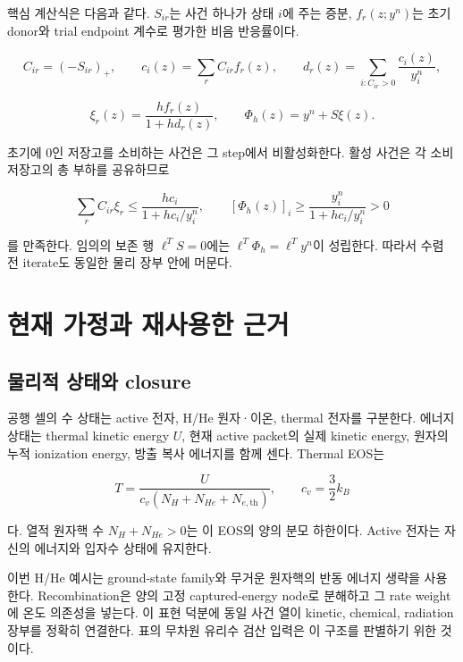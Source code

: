 \documentclass[11pt,a4paper]{article}
\begin{document}
핵심 계산식은 다음과 같다. \(S_{ir}\)는 사건 하나가 상태 \(i\)에 주는 증분, \(f_r(z;y^n)\)는 초기 donor와 trial endpoint 계수로 평가한 비음 반응률이다.

\[
C_{ir}=(-S_{ir})_+,\qquad
c_i(z)=\sum_r C_{ir}f_r(z),\qquad
d_r(z)=\sum_{i:C_{ir}>0}\frac{c_i(z)}{y_i^n},
\]

\[
\boxed{
\xi_r(z)=\frac{h f_r(z)}{1+h d_r(z)},\qquad
\Phi_h(z)=y^n+S\xi(z).
}
\]

초기에 0인 저장고를 소비하는 사건은 그 step에서 비활성화한다. 활성 사건은 각 소비 저장고의 총 부하를 공유하므로

\[
\sum_r C_{ir}\xi_r
\le\frac{h c_i}{1+h c_i/y_i^n},\qquad
[\Phi_h(z)]_i\ge\frac{y_i^n}{1+h c_i/y_i^n}>0
\]

를 만족한다. 임의의 보존 행 \(\ell^TS=0\)에는 \(\ell^T\Phi_h=\ell^Ty^n\)이 성립한다. 따라서 수렴 전 iterate도 동일한 물리 장부 안에 머문다.

\hypertarget{uxd604uxc7ac-uxac00uxc815uxacfc-uxc7acuxc0acuxc6a9uxd55c-uxadfcuxac70}{%
\section{현재 가정과 재사용한 근거}\label{uxd604uxc7ac-uxac00uxc815uxacfc-uxc7acuxc0acuxc6a9uxd55c-uxadfcuxac70}}

\hypertarget{uxbb3cuxb9acuxc801-uxc0c1uxd0dcuxc640-closure}{%
\subsection{물리적 상태와 closure}\label{uxbb3cuxb9acuxc801-uxc0c1uxd0dcuxc640-closure}}

공행 셀의 수 상태는 active 전자, H/He 원자·이온, thermal 전자를 구분한다. 에너지 상태는 thermal kinetic energy \(U\), 현재 active packet의 실제 kinetic energy, 원자의 누적 ionization energy, 방출 복사 에너지를 함께 센다. Thermal EOS는

\[
T=\frac{U}{c_v(N_H+N_{He}+N_{e,\mathrm{th}})},\qquad
c_v=\frac32k_B
\]

다. 열적 원자핵 수 \(N_H+N_{He}>0\)는 이 EOS의 양의 분모 하한이다. Active 전자는 자신의 에너지와 입자수 상태에 유지한다.

이번 H/He 예시는 ground-state family와 무거운 원자핵의 반동 에너지 생략을 사용한다. Recombination은 양의 고정 captured-energy node로 분해하고 그 rate weight에 온도 의존성을 넣는다. 이 표현 덕분에 동일 사건 열이 kinetic, chemical, radiation 장부를 정확히 연결한다. 표의 무차원 유리수 검산 입력은 이 구조를 판별하기 위한 것이다.
\end{document}
